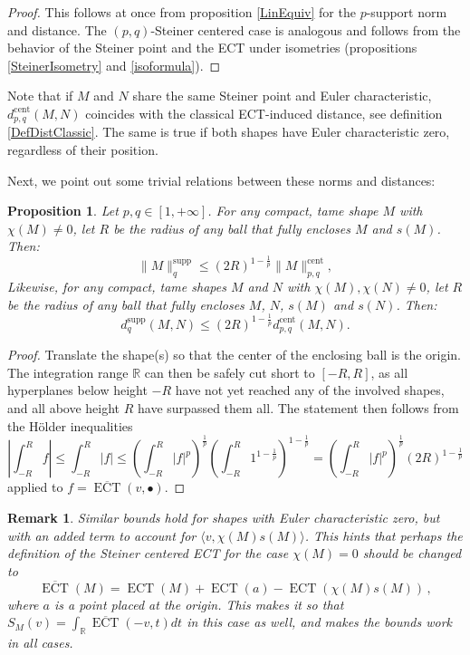 \documentclass[a4paper]{article}
\newtheorem{prop}[theorem]{Proposition}
\newtheorem{remark}[theorem]{Remark}
\newcommand{\ECT}{\operatorname{ECT}}
\newcommand{\bb}{\mathbb}
\newcommand{\la}{\langle}
\newcommand{\ra}{\rangle}
\newcommand{\dsupp}{d^{\operatorname{supp}}}
\newcommand{\dcent}{d^{\operatorname{cent}}}
\newcommand{\normsupp}[1]{\|#1\|^{\operatorname{supp}}}
\newcommand{\normcent}[1]{\|#1\|^{\operatorname{cent}}}
\begin{document}
\begin{proof}
	This follows at once from proposition \ref{LinEquiv} for the $p$-support norm and distance. The $(p,q)$-Steiner centered case is analogous and follows from the behavior of the Steiner point and the ECT under isometries (propositions  \ref{SteinerIsometry} and \ref{isoformula}).
\end{proof}

Note that if $M$ and $N$ share the same Steiner point and Euler characteristic, $\dcent_{p,q}(M,N)$ coincides with the classical ECT-induced distance, see definition \ref{DefDistClassic}. The same is true if both shapes have Euler characteristic zero, regardless of their position. 

Next, we point out some trivial relations between these norms and distances:
\begin{prop}
	\label{DistanceBounds}
	Let $p,q \in [1, +\infty]$. For any compact, tame shape $M$ with $\chi(M) \neq 0$, let $R$ be the radius of any ball that fully encloses $M$ and $s(M)$. Then:
	\[ \normsupp M_q\leq (2R)^{1-\frac{1}{p}}\normcent M_ {p,q},\]
	Likewise, for any compact, tame shapes $M$ and $N$ with $\chi(M), \chi(N) \neq 0$, let $R$ be the radius of any ball that fully encloses $M$, $N$, $s(M)$ and $s(N)$. Then:
	\[ \dsupp_q(M,N)\leq (2R)^{1-\frac{1}{p}}\dcent_{p,q}(M,N).\]
\end{prop}
\begin{proof}
	Translate the shape(s) so that the center of the enclosing ball is the origin. The integration range $\bb R$ can then be safely cut short to $[-R, R]$, as all hyperplanes below height $-R$ have not yet reached any of the involved shapes, and all above height $R$ have surpassed them all. The statement then follows from the Hölder inequalities \[ \left|\int_{-R}^R f\right| \leq \int_{-R}^R |f| \leq\left(\int_{-R}^R |f|^p\right)^\frac{1}{p}\left( \int_{-R}^R 1^{1-\frac{1}{p}}\right)^{1-\frac{1}{p}} =  \left(\int_{-R}^R |f|^p\right)^\frac{1}{p} (2R)^{1-\frac{1}{p}}\]
	applied to $f=\overline{\ECT}(v,\bullet)$.
\end{proof}

\begin{remark}
	\label{RmkAlternativeCentered}
	Similar bounds hold for shapes with Euler characteristic zero, but with an added term to account for $\la v, \chi(M)s(M)\ra$. This hints that perhaps the definition of the Steiner centered ECT for the case $\chi(M)=0$ should be changed to 
	\[ \overline{\ECT}(M)=\ECT(M)+\ECT(a)-\ECT(\chi(M)s(M))\, , \]
	where $a$ is a point placed at the origin. This makes it so that $S_M(v)= \int_\bb R \overline{\ECT}(-v, t) dt$ in this case as well, and makes the bounds work in all cases.
\end{remark}
\end{document}
